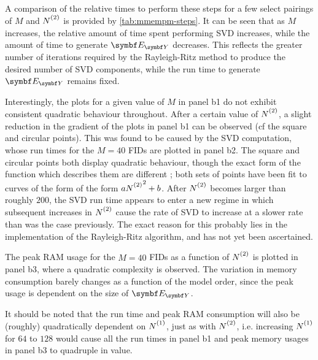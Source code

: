 A comparison of the relative times to perform these steps for a few select
pairings of $M$ and $\Ntwo$ is provided by \cref{tab:mmempm-steps}. It can be
seen that as $M$ increases, the relative amount of time spent performing
\ac{SVD} increases, while the amount of time to generate $\EY$ decreases. This
reflects the greater number of iterations required by
the Rayleigh-Ritz method to produce the desired number of \ac{SVD} components,
while the run time to generate $\EY$ remains fixed.

Interestingly, the plots for a given value of $M$ in panel b1 do not exhibit
consistent quadratic behaviour throughout. After a certain value of $\Ntwo$, a
slight reduction in the gradient of the plots in panel b1 can be observed (cf
the square and circular points). This was found to be caused by the \ac{SVD}
computation, whose run times for the $M=40$ \acp{FID} are plotted in panel b2.
The square and circular points both display quadratic behaviour, though the
exact form of the function which
describes them are different ; both sets of points have been fit to curves of
the form of the form $a\Ntwo^2 + b$. After $\Ntwo$ becomes larger than
roughly $200$, the \ac{SVD} run time appears to enter a new regime in which
subsequent increases in  $\Ntwo$ cause the rate of \ac{SVD} to increase at a
slower rate than was the case previously. The exact reason for this probably
lies in the implementation of the Rayleigh-Ritz algorithm, and has not yet been
ascertained.

The peak \ac{RAM} usage for the $M=40$ \acp{FID} as a function of $\Ntwo$ is
plotted in panel b3, where a quadratic complexity is observed. The variation in
memory consumption barely changes as a function of the model order, since the
peak usage is dependent on the size of $\EY$.

It should be noted that the run time and peak \ac{RAM} consumption will also be
(roughly) quadratically dependent on $\None$, just as with $\Ntwo$, i.e.
increasing  $\None$ for  $64$ to  $128$ would cause all the run times in panel
b1 and peak memory usages in panel b3 to quadruple in value.

